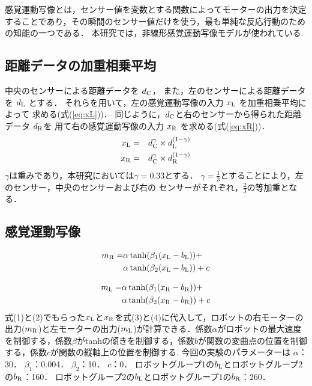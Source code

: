感覚運動写像とは，センサー値を変数とする関数によってモーターの出力を決定することであり，その瞬間のセンサー値だけを使う，最も単純な反応行動のための知能の一つである．
本研究では，非線形感覚運動写像モデルが使われている.

\subsection{距離データの加重相乗平均}
中央のセンサーによる距離データを $d_{\rm C}$，
また，左のセンサーによる距離データを $d_{\rm L}$ とする．
それらを用いて，左の感覚運動写像の入力 $x_{\rm L}$ を加重相乗平均によって
求める(式(\ref{eq:xL}))．
同じように，$d_{\rm C}$と右のセンサーから得られた距離データ $d_{\rm R}$を
用て右の感覚運動写像の入力 $x_{\rm R}$ を求める(式(\ref{eq:xR}))．
\begin{eqnarray}
  x_{\rm L} &=& d_{\rm C}^{\gamma} \times d_{\rm L}^{(1-\gamma)}
  \label{eq:xL} \\
  x_{\rm R} &=& d_{\rm C}^{\gamma} \times d_{\rm R}^{(1-\gamma)}
  \label{eq:xR}
\end{eqnarray}
$\gamma$は重みであり，本研究においては$\gamma=0.33$とする．
$\gamma=\frac{1}{3}$とすることにより，左のセンサー，中央のセンサーおよび右の
センサーがそれぞれ，$\frac{2}{3}$の等加重となる．

\subsection{感覚運動写像}
\begin{equation}
\begin{aligned}
  m_{\rm R} = &\alpha \tanh(\beta_1(x_{\rm L} - b_{\rm L})) + \\
        &\alpha \tanh(\beta_2(x_{\rm L} - b_{\rm L})) + c
\end{aligned}
\end{equation}

\begin{equation}
\begin{aligned}
  m_{\rm L} = &\alpha \tanh(\beta_1(x_{\rm R} - b_{\rm R})) + \\
        &\alpha \tanh(\beta_2(x_{\rm R} - b_{\rm R})) + c
\end{aligned}
\end{equation}
式(1)と(2)でもらった$x_{\rm L}$と$x_{\rm R}$を式(3)と(4)に代入して，ロボットの右モーターの出力($m_{\rm R}$)と左モーターの出力($m_{\rm L}$)が計算できる．係数$\alpha$がロボットの最大速度を制御する，係数$\beta$が{\rm tanh}の傾きを制御する，係数$b$が関数の変曲点の位置を制御する，係数$c$が関数の縦軸上の位置を制御する. 
今回の実験のパラメーターは
$\alpha$：30．
$\beta_1$：0.004．
$\beta_2$：10．
$c$：0．
ロボットグループ1の$b_{\rm L}$とロボットグループ2の$b_{\rm R}$：160．
ロボットグループ2の$b_{\rm L}$とロボットグループ1の$b_{\rm R}$：260．
   
